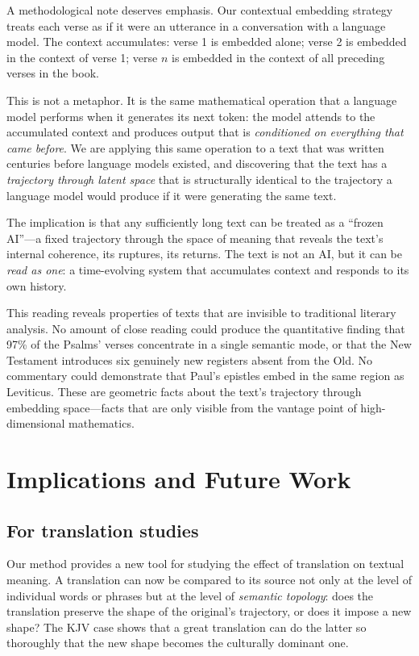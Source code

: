 \documentclass[11pt,a4paper]{article}
\theoremstyle{definition}
\begin{document}
A methodological note deserves emphasis. Our contextual embedding strategy treats each verse as if it were an utterance in a conversation with a language model. The context accumulates: verse 1 is embedded alone; verse 2 is embedded in the context of verse 1; verse $n$ is embedded in the context of all preceding verses in the book.

This is not a metaphor. It is the same mathematical operation that a language model performs when it generates its next token: the model attends to the accumulated context and produces output that is \emph{conditioned on everything that came before}. We are applying this same operation to a text that was written centuries before language models existed, and discovering that the text has a \emph{trajectory through latent space} that is structurally identical to the trajectory a language model would produce if it were generating the same text.

The implication is that any sufficiently long text can be treated as a ``frozen AI''---a fixed trajectory through the space of meaning that reveals the text's internal coherence, its ruptures, its returns. The text is not an AI, but it can be \emph{read as one}: a time-evolving system that accumulates context and responds to its own history.

This reading reveals properties of texts that are invisible to traditional literary analysis. No amount of close reading could produce the quantitative finding that 97\% of the Psalms' verses concentrate in a single semantic mode, or that the New Testament introduces six genuinely new registers absent from the Old. No commentary could demonstrate that Paul's epistles embed in the same region as Leviticus. These are geometric facts about the text's trajectory through embedding space---facts that are only visible from the vantage point of high-dimensional mathematics.


\section{Implications and Future Work}

\subsection{For translation studies}

Our method provides a new tool for studying the effect of translation on textual meaning. A translation can now be compared to its source not only at the level of individual words or phrases but at the level of \emph{semantic topology}: does the translation preserve the shape of the original's trajectory, or does it impose a new shape? The KJV case shows that a great translation can do the latter so thoroughly that the new shape becomes the culturally dominant one.
\end{document}
